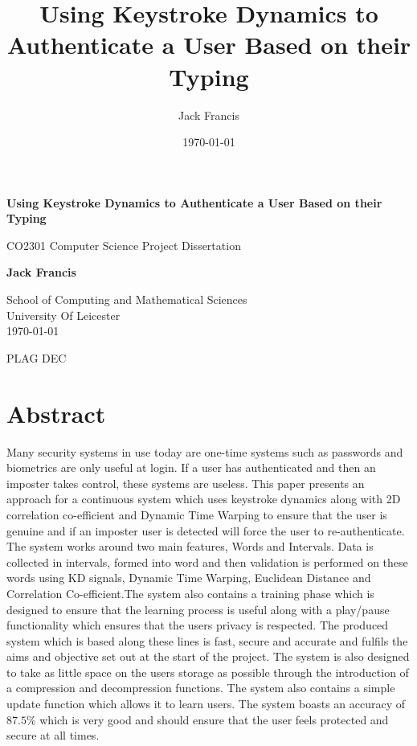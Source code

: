 \documentclass[10pt,a4paper]{report}
\title{Using Keystroke Dynamics to Authenticate a User Based on their Typing}
\author{Jack Francis}
\date{\today}
\begin{document}
\begin{titlepage}
    \begin{center}
        \vspace*{1cm}
            
        \Huge
        \textbf{Using Keystroke Dynamics to Authenticate a User Based on their Typing}
            
        \vspace{0.5cm}
        \LARGE
        CO2301 Computer Science Project Dissertation
            
        \vspace{1.5cm}
            
        \textbf{Jack Francis}
            
        \vfill
            
        \vspace{0.8cm}
            
        \Large
        School of Computing and Mathematical Sciences\\
        University Of Leicester\\
        \today
            
    \end{center}
\end{titlepage}

\newpage
PLAG DEC


\chapter*{Abstract}

Many security systems in use today are one-time systems such as passwords and biometrics are only useful at login. If a user has authenticated and then an imposter takes control, these systems are useless. This paper presents an approach for a continuous system which uses keystroke dynamics along with 2D correlation co-efficient and Dynamic Time Warping to ensure that the user is genuine and if an imposter user is detected will force the user to re-authenticate. The system works around two main features, Words and Intervals. Data is collected in intervals, formed into word and then validation is performed on these words using KD signals, Dynamic Time Warping, Euclidean Distance and Correlation Co-efficient.The system also contains a training phase which is designed to ensure that the learning process is useful along with a play/pause functionality which ensures that the users privacy is respected. The produced system which is based along these lines is fast, secure and accurate and fulfils the aims and objective set out at the start of the project. The system is also designed to take as little space on the users storage as possible through the introduction of a compression and decompression functions. The system also contains a simple update function which allows it to learn users.  The system boasts an accuracy of \(87.5\%\) which is very good and should ensure that the user feels protected and secure at all times.
\end{document}
